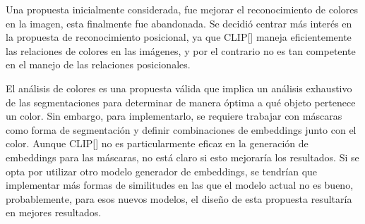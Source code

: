 Una propuesta inicialmente considerada, fue mejorar el reconocimiento de colores en la imagen, esta finalmente fue abandonada. Se decidió centrar más interés en la propuesta de reconocimiento posicional, ya que CLIP[\cite{clip}]  maneja eficientemente las relaciones de colores en las imágenes, y por el contrario no es tan competente en el manejo de las relaciones posicionales.

El análisis de colores es una propuesta válida que implica un análisis exhaustivo de las segmentaciones para determinar de manera óptima a qué objeto pertenece un color. Sin embargo, para implementarlo, se requiere trabajar con máscaras como forma de segmentación y definir combinaciones de embeddings junto con el color. Aunque CLIP[\cite{clip}]  no es particularmente eficaz en la generación de embeddings para las máscaras, no está claro si esto mejoraría los resultados. Si se opta por utilizar otro modelo generador de embeddings, se tendrían que implementar más formas de similitudes en las que el modelo actual no es bueno, probablemente, para esos nuevos modelos, el dise\~no de esta propuesta resultaría en mejores resultados.

